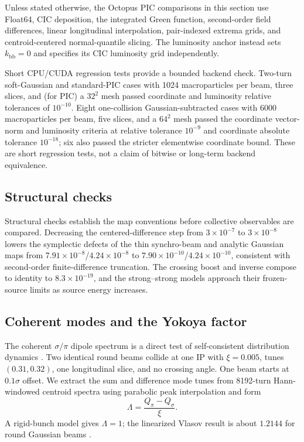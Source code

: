 \documentclass[a4paper,fleqn]{cas-sc}
\newcommand{\kbb}{k_{\mathrm{bb}}}
\begin{document}
Unless stated otherwise, the Octopus PIC comparisons in this section use
Float64, CIC deposition, the integrated Green function, second-order field
differences, linear longitudinal interpolation, pair-indexed extrema grids,
and centroid-centered normal-quantile slicing.  The luminosity anchor instead
sets $\kbb=0$ and specifies its CIC luminosity grid independently.

Short CPU/CUDA regression tests provide a bounded backend check.  Two-turn
soft-Gaussian and standard-PIC cases with 1024 macroparticles per beam, three
slices, and (for PIC) a $32^2$ mesh passed coordinate and luminosity relative
tolerances of $10^{-10}$.  Eight one-collision Gaussian-subtracted cases with
6000 macroparticles per beam, five slices, and a $64^2$ mesh passed the
coordinate vector-norm and luminosity criteria at relative tolerance
$10^{-9}$ and coordinate absolute tolerance $10^{-18}$; six also passed the
stricter elementwise coordinate bound.  These are short regression tests, not
a claim of bitwise or long-term backend equivalence.

\subsection{Structural checks}
\label{sec:eicdemo}

Structural checks establish the map conventions before collective observables
are compared.  Decreasing the centered-difference step from
$3\times10^{-7}$ to $3\times10^{-8}$ lowers the symplectic defects of the thin
synchro-beam and analytic Gaussian maps from
$7.91\times10^{-8}$/$4.24\times10^{-8}$ to
$7.90\times10^{-10}$/$4.24\times10^{-10}$, consistent with second-order
finite-difference truncation.  The crossing boost and inverse compose to
identity to $8.3\times10^{-19}$, and the strong--strong models approach their
frozen-source limits as source energy increases.

\subsection{Coherent modes and the Yokoya factor}
\label{sec:yokoya}

The coherent $\sigma/\pi$ dipole spectrum is a direct test of
self-consistent distribution dynamics
\citep{MellerSiemann1981,YokoyaKoiso1990,Alexahin2002}.  Two identical round
beams collide at one IP with $\xi=0.005$, tunes $(0.31,0.32)$, one
longitudinal slice, and no crossing angle.  One beam starts at
$0.1\sigma$ offset.  We extract the sum and difference mode tunes from
8192-turn Hann-windowed centroid spectra using parabolic peak interpolation
and form
\begin{equation}
  \Lambda=\frac{Q_\pi-Q_\sigma}{\xi}.
  \label{eq:yokoya}
\end{equation}
A rigid-bunch model gives $\Lambda=1$; the linearized Vlasov result is about
$1.2144$ for round Gaussian beams
\citep{YokoyaKoiso1990,HerrPieloni2014}.
\end{document}

